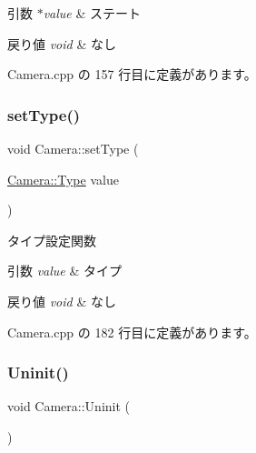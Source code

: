 \begin{DoxyParams}{引数}
{\em $\ast$value} & ステート \\
\hline
\end{DoxyParams}

\begin{DoxyRetVals}{戻り値}
{\em void} & なし \\
\hline
\end{DoxyRetVals}


 Camera.\+cpp の 157 行目に定義があります。

\mbox{\label{class_camera_a93ecfb5163ef828fb6a5e2238954685e}} 
\subsubsection{\texorpdfstring{set\+Type()}{setType()}}
{\footnotesize\ttfamily void Camera\+::set\+Type (\begin{DoxyParamCaption}\item[{\mbox{\hyperlink{class_camera_a3b0a1f58deca679ac665f61c480d1dcb}{Camera\+::\+Type}}}]{value }\end{DoxyParamCaption})}



タイプ設定関数 


\begin{DoxyParams}{引数}
{\em value} & タイプ \\
\hline
\end{DoxyParams}

\begin{DoxyRetVals}{戻り値}
{\em void} & なし \\
\hline
\end{DoxyRetVals}


 Camera.\+cpp の 182 行目に定義があります。

\mbox{\label{class_camera_a8b3337b3e560ea6a780d646bc8c509d7}} 
\subsubsection{\texorpdfstring{Uninit()}{Uninit()}}
{\footnotesize\ttfamily void Camera\+::\+Uninit (\begin{DoxyParamCaption}{ }\end{DoxyParamCaption})}



